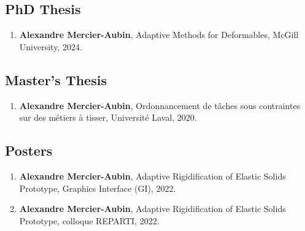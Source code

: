 \documentclass[10pt]{article} %
\begin{document}
\subsection{PhD Thesis}
\begin{enumerate}
  \setcounter{enumi}{\value{listCounter}}
  \item \textbf{Alexandre Mercier-Aubin}, Adaptive Methods for Deformables, McGill University, 2024. 
\end{enumerate}

\subsection{Master's Thesis}
\begin{enumerate}
  \setcounter{enumi}{\value{listCounter}}
  \item \textbf{Alexandre Mercier-Aubin}, Ordonnancement de tâches sous contraintes sur des métiers à tisser, Université Laval, 2020. 
\end{enumerate}


\subsection{Posters}
\begin{enumerate}
  \setcounter{enumi}{\value{listCounter}}
  \item \textbf{Alexandre Mercier-Aubin}, Adaptive Rigidification of Elastic Solids Prototype, Graphics Interface (GI), 2022. 
  \item \textbf{Alexandre Mercier-Aubin}, Adaptive Rigidification of Elastic Solids Prototype, colloque REPARTI, 2022. 
\end{enumerate}
\end{document}

